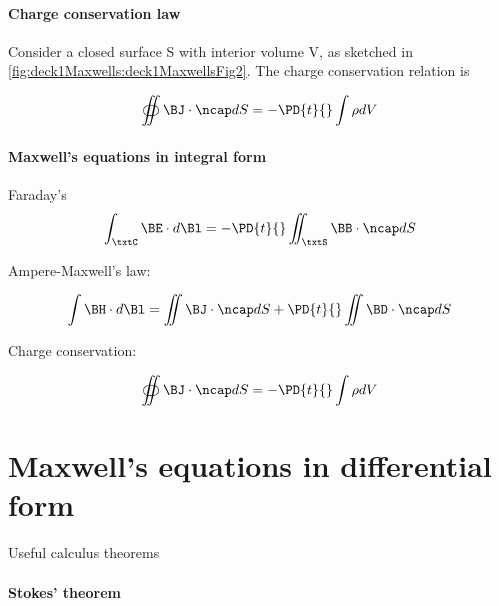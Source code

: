 \paragraph{Charge conservation law}

Consider a closed surface S with interior volume V, as sketched in \cref{fig:deck1Maxwells:deck1MaxwellsFig2}.  The charge conservation relation is


\begin{dmath}\label{eqn:uwavesLecture1:60}
\oiint \BJ \cdot \ncap dS = -\PD{t}{} \int \rho dV
\end{dmath}

\paragraph{Maxwell's equations in integral form}

Faraday's
\begin{dmath}\label{eqn:uwavesLecture1:80}
\int_\txtC \BE \cdot d\Bl = - \PD{t}{} \iint_\txtS \BB \cdot \ncap dS
\end{dmath}

Ampere-Maxwell's law:

\begin{dmath}\label{eqn:uwavesLecture1:100}
\int \BH \cdot d\Bl = \iint \BJ \cdot \ncap dS + \PD{t}{} \iint \BD \cdot \ncap dS
\end{dmath}

Charge conservation:

\begin{dmath}\label{eqn:uwavesLecture1:120}
\oiint \BJ \cdot \ncap dS = -\PD{t}{} \int \rho dV
\end{dmath}

\section{Maxwell's equations in differential form}

Useful calculus theorems

\paragraph{Stokes' theorem}

